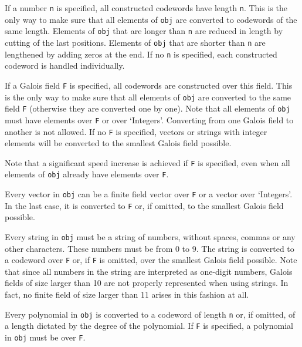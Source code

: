 \documentclass[11pt]{report}
\begin{document}
{{{ If a number \mbox{\texttt{n}} is specified, all constructed codewords have length \mbox{\texttt{n}}. This is the only way to make sure that all elements of \mbox{\texttt{obj}} are converted to codewords of the same length. Elements of \mbox{\texttt{obj}} that are longer than \mbox{\texttt{n}} are reduced in length by cutting of the last positions. Elements of \mbox{\texttt{obj}} that are shorter than \mbox{\texttt{n}} are lengthened by adding zeros at the end. If no \mbox{\texttt{n}} is specified, each constructed codeword is handled individually. 

 If a Galois field \mbox{\texttt{F}} is specified, all codewords are constructed over this field. This is the only
way to make sure that all elements of \mbox{\texttt{obj}} are converted to the same field \mbox{\texttt{F}} (otherwise they are converted one by one). Note that all elements of \mbox{\texttt{obj}} must have elements over \mbox{\texttt{F}} or over `Integers'. Converting from one Galois field to another is not
allowed. If no \mbox{\texttt{F}} is specified, vectors or strings with integer elements will be converted to
the smallest Galois field possible. 

 Note that a significant speed increase is achieved if \mbox{\texttt{F}} is specified, even when all elements of \mbox{\texttt{obj}} already have elements over \mbox{\texttt{F}}. 

 Every vector in \mbox{\texttt{obj}} can be a finite field vector over \mbox{\texttt{F}} or a vector over `Integers'. In the last case, it is converted to \mbox{\texttt{F}} or, if omitted, to the smallest Galois field possible. 

 Every string in \mbox{\texttt{obj}} must be a string of numbers, without spaces, commas or any other characters.
These numbers must be from 0 to 9. The string is converted to a codeword over \mbox{\texttt{F}} or, if \mbox{\texttt{F}} is omitted, over the smallest Galois field possible. Note that since all
numbers in the string are interpreted as one-digit numbers, Galois fields of
size larger than 10 are not properly represented when using strings. In fact,
no finite field of size larger than 11 arises in this fashion at all. 

 Every polynomial in \mbox{\texttt{obj}} is converted to a codeword of length \mbox{\texttt{n}} or, if omitted, of a length dictated by the degree of the polynomial. If \mbox{\texttt{F}} is specified, a polynomial in \mbox{\texttt{obj}} must be over \mbox{\texttt{F}}. 

}}}
\end{document}
